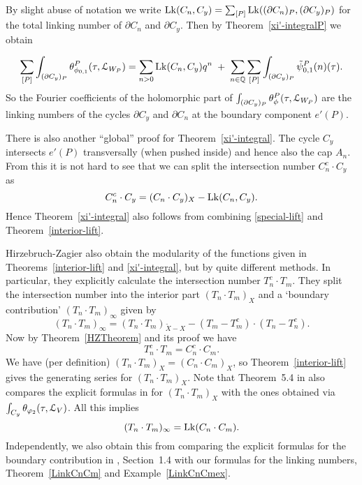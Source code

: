 By slight abuse of notation we write $\operatorname{Lk}(C_n,C_y) = \sum_{[P]} \operatorname{Lk}((\partial C_n)_P, (\partial C_y)_P)$ for the total linking number of $\partial C_n$ and $\partial C_y$. Then by Theorem~\ref{xi'-integralP} we obtain

\begin{theorem}\label{xi'-integral}
\[
\sum_{[P]}\int_{(\partial C_y)_P} \theta^P_{\phi_{0,1}}(\tau,\mathcal{L}_{W_P}) = 
  \sum_{n>0}  \operatorname{Lk}(C_n,C_y) q^n
 \; + \; \sum_{n \in \mathbb{Q}} \sum_{[P]} \int_{(\partial C_y)_{P}}  {\tilde{\psi}_{0,1}^P}(n)(\tau).
\]
 So the Fourier coefficients of the holomorphic part of $\int_{(\partial C_y)_P} \theta^P_{\phi}(\tau,\mathcal{L}_{W_P})$ are the linking numbers of the cycles $\partial C_y$ and $ \partial C_n$ at the boundary component $e'(P)$.  
 \end{theorem}

\begin{remark}
There is also another ``global'' proof for Theorem~\ref{xi'-integral}. The cycle $C_y$ intersects $e'(P)$ transversally (when pushed inside) and hence also the cap $A_n$. From this it is not hard to see that we can split the intersection number $C_n^c \cdot C_y$ as 
\[
C^c_n \cdot C_y  =  (C_n \cdot C_y)_X  -  \operatorname{Lk}(C_n,C_y).
\]
Hence Theorem~\ref{xi'-integral} also follows from combining \eqref{special-lift} and Theorem~\ref{interior-lift}. 
\end{remark}

Hirzebruch-Zagier also obtain the modularity of the functions given in Theorems~\ref{interior-lift} and \ref{xi'-integral}, but by quite different methods. In particular, they explicitly calculate the intersection number $T^c_n \cdot T_m$. They split the intersection number into the interior part $(T_n \cdot T_m)_X$ and a `boundary contribution' $(T_n \cdot T_m)_{\infty}$ given by 
 \[
 (T_n \cdot T_m )_{\infty} = (T_n \cdot T_m)_{\tilde{X}-X}  - ({T}_m-T_m^c) \cdot ({T}_n -T_n^c).
 \]
Now by Theorem~\ref{HZTheorem} and its proof we have
\[
T^c_n \cdot T_m = C^c_n \cdot C_m.
\]
We have (per definition) $(T_n \cdot T_m)_X = (C_n \cdot C_m)_X$, so Theorem~\ref{interior-lift} gives the generating series for $(T_n \cdot T_m)_X$. Note that Theorem~5.4 in \cite{FCompo} also compares the explicit formulas in \cite{HZ} for $(T_n \cdot T_m)_X$ with the ones obtained via  $\int_{C_y} \theta_{\varphi_2}(\tau,\mathcal{L}_V)$. All this implies
\[
 (T_n \cdot T_m)_{\infty}  =\operatorname{Lk}( C_n \cdot C_m).
 \]
Independently, we also obtain this from comparing the explicit formulas for the boundary contribution in \cite{HZ}, Section~1.4 with our formulas for the linking numbers, Theorem~\ref{LinkCnCm} and Example~\ref{LinkCnCmex}.

